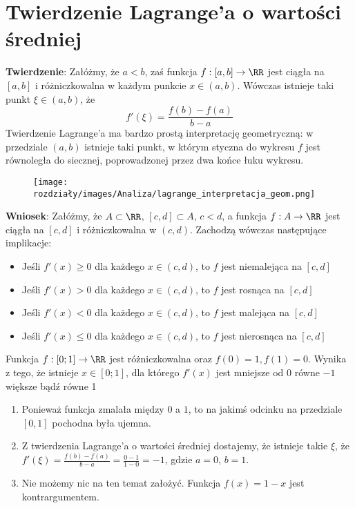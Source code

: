 \section{Twierdzenie Lagrange'a o wartości średniej}
\textbf{Twierdzenie}:
Załóżmy, że $a<b$, zaś funkcja $f:[a,b]\to\RR$ jest ciągła na $[a,b]$ i różniczkowalna w każdym punkcie $x\in(a,b)$. Wówczas istnieje taki punkt $\xi\in(a,b)$, że
$$f'(\xi)=\frac{f(b)-f(a)}{b-a}$$
Twierdzenie Lagrange'a ma bardzo prostą interpretację geometryczną: w przedziale $(a,b)$ istnieje taki punkt, w którym styczna do wykresu $f$ jest równoległa do siecznej, poprowadzonej przez dwa końce łuku wykresu.
\begin{figure}[h]
    \centering
    \texttt{[image: rozdziały/images/Analiza/lagrange\_interpretacja\_geom.png]}
\end{figure}

\textbf{Wniosek}: Załóżmy, że $A\subset\RR$, $[c,d]\subset A$, $c<d$, a funkcja $f:A\to\RR$ jest ciągła na $[c,d]$ i różniczkowalna w $(c,d)$. Zachodzą wówczas następujące implikacje:
\begin{itemize}
    \item Jeśli $f'(x)\geq0$ dla każdego $x\in(c,d)$, to $f$ jest niemalejąca na $[c,d]$
    \item Jeśli $f'(x)>0$ dla każdego $x\in(c,d)$, to $f$ jest rosnąca na $[c,d]$
    \item Jeśli $f'(x)<0$ dla każdego $x\in(c,d)$, to $f$ jest malejąca na $[c,d]$
    \item Jeśli $f'(x)\leq0$ dla każdego $x\in(c,d)$, to $f$ jest nierosnąca na $[c,d]$
\end{itemize}

\begin{exam}
    Funkcja $f : [0; 1] \rightarrow \RR$ jest różniczkowalna oraz $f(0) = 1, f(1) = 0$. Wynika z tego, że istnieje $x \in [0; 1]$, dla którego $f'(x)$ jest
    \answers
    {mniejsze od 0}
    {równe $-1$}
    {większe bądź równe 1}
    \bigskip

    \begin{enumerate}[\bf A.]
        \item Ponieważ funkcja zmalała między $0$ a $1$, to na jakimś odcinku na przedziale  $[0,1]$ pochodna była ujemna.

        \item Z twierdzenia Lagrange'a o wartości średniej dostajemy, że istnieje takie $\xi$, że $f'(\xi)=\frac{f(b)-f(a)}{b-a}=\frac{0-1}{1-0}=-1$, gdzie $a=0$, $b=1$.

        \item Nie możemy nic na ten temat założyć. Funkcja $f(x) = 1-x$ jest kontrargumentem.
    \end{enumerate}
\end{exam}

